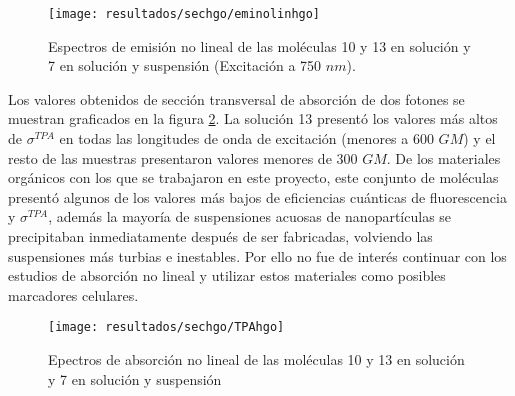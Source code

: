 \begin{figure}[h]
\centering
\texttt{[image: resultados/sechgo/eminolinhgo]}
\caption{Espectros de emisi\'on no lineal de las mol\'eculas 10 y 13 en soluci\'on y 7 en soluci\'on y suspensi\'on (Excitaci\'on a 750 $nm$).}\label{eminlhgo}
\end{figure}

Los valores obtenidos de secci\'on transversal de absorci\'on de dos fotones se muestran graficados en la figura \ref{tpahgo}. La soluci\'on 13 present\'o los valores m\'as altos de $\sigma^{TPA}$ en todas las longitudes de onda de excitaci\'on (menores a 600 $GM$) y el resto de las muestras presentaron valores menores de 300 $GM$. De los materiales org\'anicos con los que se trabajaron en este proyecto, este conjunto de mol\'eculas present\'o algunos de los valores m\'as bajos de eficiencias cu\'anticas de fluorescencia y $\sigma^{TPA}$, adem\'as la mayor\'ia de suspensiones acuosas de nanopart\'iculas se precipitaban inmediatamente despu\'es de ser fabricadas, volviendo las suspensiones m\'as turbias e inestables. Por ello no fue de inter\'es continuar con los estudios de absorci\'on no lineal y utilizar estos materiales como posibles marcadores celulares.



\begin{figure}[H]
\centering
\texttt{[image: resultados/sechgo/TPAhgo]}
\caption{Epectros de absorci\'on no lineal de las mol\'eculas 10 y 13 en soluci\'on y 7 en soluci\'on y suspensi\'on}\label{tpahgo}
\end{figure}







